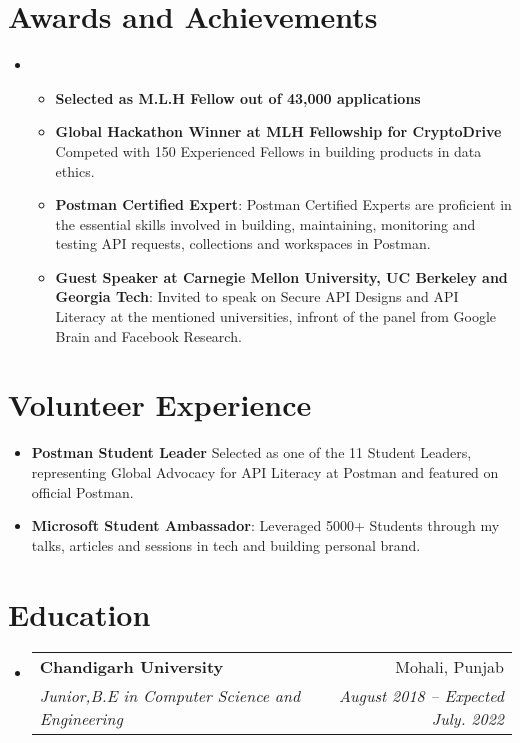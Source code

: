 \documentclass[letterpaper,11pt]{article}
\makeatletter
\newcommand{\resumeItem}[1]{
  \item\small{
    {#1 \vspace{-2pt}}
  }
}
\newcommand{\resumeSubheading}[4]{
  \vspace{-2pt}\item
    \begin{tabular*}{0.97\textwidth}[t]{l@{\extracolsep{\fill}}r}
      \textbf{#1} & #2 \\
      \textit{\small#3} & \textit{\small #4} \\
    \end{tabular*}\vspace{-7pt}
}
\newcommand{\resumeSubHeadingListStart}{\begin{itemize}[leftmargin=0.15in, label={}]}
\newcommand{\resumeSubHeadingListEnd}{\end{itemize}}
\newcommand{\resumeItemListStart}{\begin{itemize}}
\newcommand{\resumeItemListEnd}{\end{itemize}\vspace{-5pt}}
\makeatother
\begin{document}
\section{Awards and Achievements}
 \begin{itemize}[leftmargin=0.15in, label={}]
    \small\item{\resumeItemListStart
        \resumeItem{\textbf{Selected as M.L.H Fellow out of 43,000 applications}}
        \resumeItem{\textbf{Global Hackathon Winner at MLH Fellowship for CryptoDrive} Competed with 150 Experienced Fellows in building products in data ethics. }
        \resumeItem{\textbf{Postman Certified Expert}: Postman Certified Experts are proficient in the essential skills involved in building, maintaining, monitoring and testing API requests, collections and workspaces in Postman. }
        \resumeItem{\textbf{Guest Speaker at Carnegie Mellon University, UC Berkeley and Georgia Tech}: Invited to speak on Secure API Designs and API Literacy at the mentioned universities, infront of the panel from Google Brain and Facebook Research.}
      \resumeItemListEnd
    }
 \end{itemize}
 \section{Volunteer Experience}
 \begin{itemize}[leftmargin=0.15in, label={}]
    \small{\item{
        \resumeItemListStart
        \resumeItem{\textbf{Postman Student Leader} Selected as one of the 11 Student Leaders, representing Global Advocacy for API Literacy at Postman and featured on official Postman.}
        \resumeItem{\textbf{Microsoft Student Ambassador}: Leveraged 5000+ Students through my talks, articles and sessions in tech and building personal brand.}
      \resumeItemListEnd
    }}
 \end{itemize}
\section{Education}
  \resumeSubHeadingListStart
    \resumeSubheading
      {Chandigarh University}{Mohali, Punjab}
      {Junior,B.E in Computer Science and Engineering}{August 2018 -- Expected July. 2022}
  \resumeSubHeadingListEnd
\end{document}
